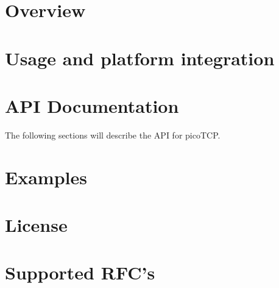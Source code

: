 \chapter{Overview}
\label{chap:overview}



\chapter{Usage and platform integration}
\label{chap:usage}



\chapter{API Documentation}
\label{chap:api_doc}
The following sections will describe the API for picoTCP.







\chapter{Examples}
\label{chap:examples}
%


\appendix

\chapter{License}
\label{chap:license}


\chapter{Supported RFC's}
\label{chap:rfcs}



